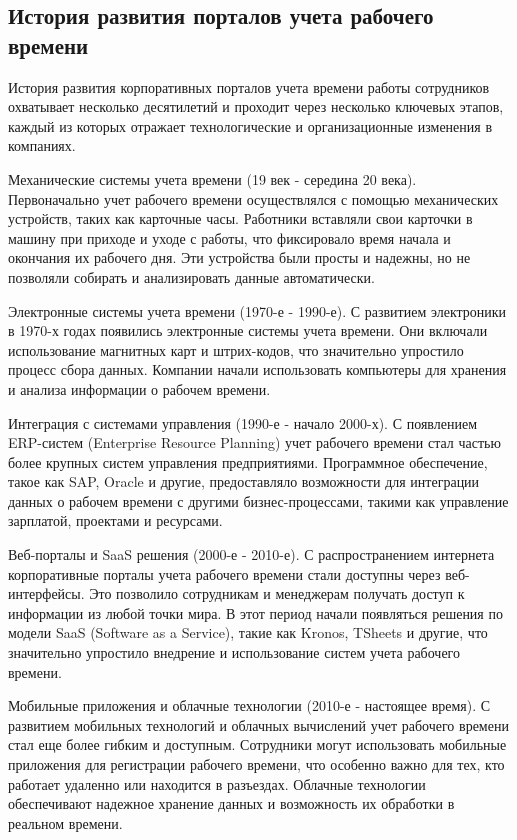 \subsection{История развития порталов учета рабочего времени}
История развития корпоративных порталов учета времени работы сотрудников охватывает несколько десятилетий и проходит через несколько ключевых этапов, каждый из которых отражает технологические и организационные изменения в компаниях.

Механические системы учета времени (19 век - середина 20 века). Первоначально учет рабочего времени осуществлялся с помощью механических устройств, таких как карточные часы. Работники вставляли свои карточки в машину при приходе и уходе с работы, что фиксировало время начала и окончания их рабочего дня. Эти устройства были просты и надежны, но не позволяли собирать и анализировать данные автоматически.

Электронные системы учета времени (1970-е - 1990-е). С развитием электроники в 1970-х годах появились электронные системы учета времени. Они включали использование магнитных карт и штрих-кодов, что значительно упростило процесс сбора данных. Компании начали использовать компьютеры для хранения и анализа информации о рабочем времени.

Интеграция с системами управления (1990-е - начало 2000-х). С появлением ERP-систем (Enterprise Resource Planning) учет рабочего времени стал частью более крупных систем управления предприятиями. Программное обеспечение, такое как SAP, Oracle и другие, предоставляло возможности для интеграции данных о рабочем времени с другими бизнес-процессами, такими как управление зарплатой, проектами и ресурсами.

Веб-порталы и SaaS решения (2000-е - 2010-е). С распространением интернета корпоративные порталы учета рабочего времени стали доступны через веб-интерфейсы. Это позволило сотрудникам и менеджерам получать доступ к информации из любой точки мира. В этот период начали появляться решения по модели SaaS (Software as a Service), такие как Kronos, TSheets и другие, что значительно упростило внедрение и использование систем учета рабочего времени.

Мобильные приложения и облачные технологии (2010-е - настоящее время). С развитием мобильных технологий и облачных вычислений учет рабочего времени стал еще более гибким и доступным. Сотрудники могут использовать мобильные приложения для регистрации рабочего времени, что особенно важно для тех, кто работает удаленно или находится в разъездах. Облачные технологии обеспечивают надежное хранение данных и возможность их обработки в реальном времени.

